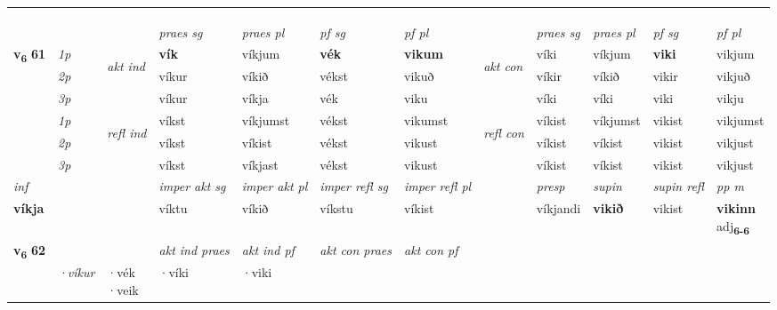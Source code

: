 \begin{longtable}[l]{X>{\footnotesize\itshape}llXXXXlXXXX}
\midrule
 & \\*
   & \\*
  & \\
   \midrule
 & &   & \textit{praes sg}  & \textit{praes pl}    & \textit{ pf sg} & \textit{pf pl} & & \textit{praes sg}  & \textit{praes pl}    & \textit{pf sg} & \textit{pf pl }  \\ \cmidrule{4-7} \cmidrule{9-12}
 \multirow{2}{*}{{{\textbf{v{\textsubscript{6}}} \Large{\textbf{61}}}}}  & 1p & \multirow{3}{*}{\begin{turn}{90}\textit{akt ind}\end{turn}} & \textbf{vík} & víkjum & \textbf{vék} & \textbf{vikum} & \multirow{3}{*}{\begin{turn}{90}\textit{akt con}\end{turn}} &víki & víkjum & \textbf{viki} & vikjum\\*
 & 2p &  &  víkur  & víkið & vékst & vikuð & & víkir & víkið & vikir & vikjuð \\*
 & 3p &  & víkur & víkja & vék & viku & & víki & víki& viki & vikju \\*
\cmidrule{4-7} \cmidrule{9-12}
 & 1p & \multirow{3}{*}{\begin{turn}{90}\textit{refl ind}\end{turn}}  & víkst & víkjumst & vékst & vikumst & \multirow{3}{*}{\begin{turn}{90}\textit{refl con}\end{turn}}  &víkist & víkjumst & vikist & vikjumst \\*
 & 2p &  & víkst & víkist & vékst & vikust & &víkist & víkist & vikist & vikjust \\*
 & 3p  & & víkst & víkjast & vékst & vikust & & víkist & víkist& vikist & vikjust \\*
\cmidrule{4-7} \cmidrule{9-12}

   {\textit{inf}} & &  & \textit{imper akt sg} & \textit{imper akt pl} & \textit{imper refl sg} & \textit{imper refl pl} && \textit{presp} & \textit{supin} & \textit{supin refl} & \textit{pp m} \\*
  {\textbf{víkja}} & && víktu  & víkið & víkstu & víkist && víkjandi &  \textbf{vikið} & vikist & \specialcell{\textbf{vikinn} \\ adj\textbf{\textsubscript{6-6}}} \\*

\midrule

\multirow{2}{*}{{{\textbf{v{\textsubscript{6}}} \Large{\textbf{62}}}}}  &&&  \textit{akt ind praes} & \textit{akt ind pf} & \textit{akt con praes} & \textit{akt con pf} \\*
\multicolumn{3}{r}{\textit{e-m}} & ·víkur & \specialcell{·vék\\  ·veik} & ·víki & ·viki \\*


\end{longtable}
